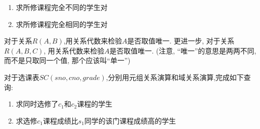 \begin{problemset}
\begin{enumerate}
  \item 求所修课程完全不同的学生对
  
  \item 求所修课程完全相同的学生对
\end{enumerate}
    \item 对于关系$R (A, B)$,用关系代数来检验$A$是否取值唯一. 更进一步, 对于关系$R(A, B, C)$, 用关系代数来检验$A$是否取值唯一. (注意, ``唯一''的意思是两两不同, 而不是只取同一个值, 那个应该叫``单一'')
    \item 对于选课表$SC(sno, cno, grade)$,分别用元组关系演算和域关系演算,完成如下查询:
\begin{enumerate}
  \item 求同时选修了$c_1$和$c_2$课程的学生
  
  \item 求选修$c_1$课程成绩比$s_1$同学的该门课程成绩高的学生
\end{enumerate}
\end{problemset}

